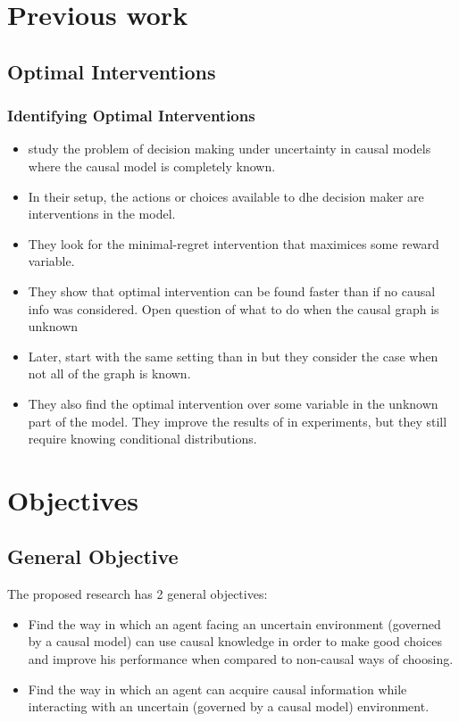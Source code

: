 \documentclass{beamer}
\theoremstyle{plain}
\begin{document}
\section{Previous work}
	\subsection{Optimal Interventions}
	\begin{frame}[allowframebreaks]
	\frametitle{Identifying Optimal Interventions}
	\begin{itemize}
		\item \cite{lattimoreNIPS2016} study the problem of decision making under uncertainty in causal models where the causal model is completely known.
		\item In their setup, the actions or choices available to dhe decision maker are interventions in the model.
		\item They look for the minimal-regret intervention that maximices some reward variable. 
		\item They show that optimal intervention can be found faster than if no causal info was considered. Open question of what to do when the causal graph is unknown
		\item Later, \cite{sen2017identifying} start with the same setting than in \cite{lattimoreNIPS2016} but they consider the case when not all of the graph is known. 
		\item They also find the optimal intervention over some variable in the unknown part of the model. They improve the results of \cite{lattimoreNIPS2016} in experiments, but they still require knowing conditional distributions.
	\end{itemize}
\end{frame}

\section{Objectives}
	\subsection{General Objective}
	\begin{frame}
	The proposed research has 2 general objectives: 
	\begin{itemize}
	\item Find the way in which an agent facing an uncertain environment (governed by a causal model) can use causal knowledge in order to make good choices and improve his performance when compared to non-causal ways of choosing.
	\item Find the way in which an agent can acquire causal information while interacting with an uncertain (governed by a causal model) environment.
	\end{itemize}
	\end{frame}
\end{document}
